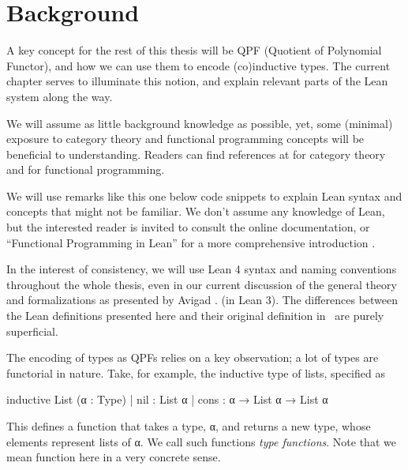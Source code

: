 \chapter{Background}
\label{ch:background}

A key concept for the rest of this thesis will be QPF (Quotient of Polynomial Functor), and how we can use them to encode (co)inductive types. The current chapter serves to illuminate this notion, and explain relevant parts of the Lean system along the way.

We will assume as little background knowledge as possible, yet, some (minimal) exposure to category theory and functional programming concepts will be beneficial to understanding. Readers can find references at \cite{awodeyCategoryTheory2010, milewskiCategoryTheoryProgrammers} for category theory and \cite{christiansenFunctionalProgrammingLean} for functional programming.


\begin{remark}
    We will use remarks like this one below code snippets to explain Lean syntax and concepts that might not be familiar. We don't assume any knowledge of Lean, but the interested reader is invited to consult the online documentation, or ``Functional Programming in Lean'' for a more comprehensive introduction
    \cite{avigadTheoremProvingLean,christiansenFunctionalProgrammingLean}.
\end{remark}

In the interest of consistency, we will use Lean 4 syntax and naming conventions throughout the whole thesis,
even in our current discussion of the general theory and formalizations as presented by Avigad \etal. (in Lean 3).
The differences between the Lean definitions presented here and their original definition in~\cite{avigadDataTypesQuotients2019a} are purely superficial.



The encoding of types as QPFs relies on a key observation; a lot of types are functorial in nature.
Take, for example, the inductive type of lists, specified as
\begin{leancode}
  inductive List (α : Type)
    | nil  : List α
    | cons : α → List α → List α
\end{leancode}

This defines a function  that takes a type, α, and returns a new type, whose elements represent lists of α.
We call such functions \emph{type functions}. Note that we mean function here in a very concrete sense.

